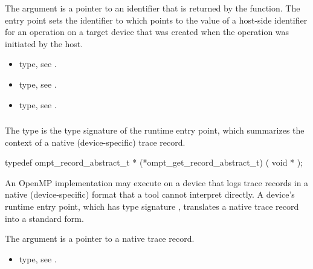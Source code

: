 The  argument is a pointer to an identifier that is 
returned by the function. The entry point sets the identifier to which
 points to the value of a host-side identifier for an 
operation on a target device that was created when the operation was 
initiated by the host.

\crossreferences
\begin{itemize}
\item {} type, see .

\item {} type, see .

\item {} type, see .
\end{itemize}



\subsubsection{}
\label{sec:ompt_get_record_abstract_t}

\summary
The  type is the type signature of the 
 runtime entry point, which summarizes the 
context of a native (device-specific) trace record.

\format
\begin{ccppspecific}
\begin{omptOther}
typedef ompt_record_abstract_t *
(*ompt_get_record_abstract_t) (
  void *
);
\end{omptOther}
\end{ccppspecific}

\descr
An OpenMP implementation may execute on a device that logs trace 
records in a native (device-specific) format that a tool cannot
interpret directly. A device's  runtime 
entry point, which has type signature , 
translates a native trace record into a standard form.

\argdesc
The  argument is a pointer to a native trace record.

\crossreferences
\begin{itemize}
\item {} type, see .
\end{itemize}



